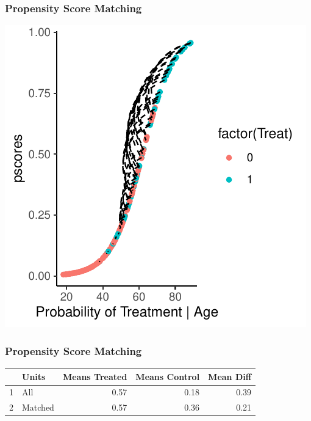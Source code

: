 \documentclass[xcolor=x11names,compress]{beamer}\usepackage[]{graphicx}\usepackage[]{color}
\makeatletter
\def\maxwidth{ %
  \ifdim\Gin@nat@width>\linewidth
    \linewidth
  \else
    \Gin@nat@width
  \fi
}
\newenvironment{knitrout}{}{} %
\renewcommand{\(}{\begin{columns}}
\renewcommand{\)}{\end{columns}}
\newcommand{\<}[1]{\begin{column}{#1}}
\renewcommand{\>}{\end{column}}
\makeatother
\begin{document}
\begin{frame}
\frametitle{Propensity Score Matching}
\begin{center}
\begin{knitrout}
\color{fgcolor}
\includegraphics[width=\maxwidth]{figure/pscore_matching_4-1} 

\end{knitrout}
\end{center}
\end{frame}

\begin{frame}
\frametitle{Propensity Score Matching}
\begin{center}
\begin{table}[ht]
\centering
\begin{tabular}{rlrrr}
  \hline
 & Units & Means Treated & Means Control & Mean Diff \\ 
  \hline
1 & All & 0.57 & 0.18 & 0.39 \\ 
  2 & Matched & 0.57 & 0.36 & 0.21 \\ 
   \hline
\end{tabular}
\end{table}

\end{center}
\end{frame}
\end{document}
